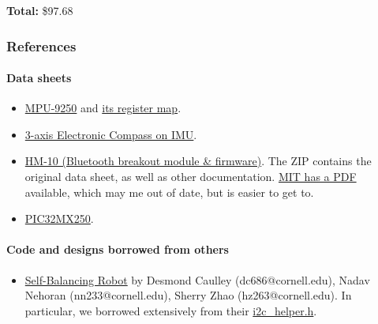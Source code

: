 \documentclass[]{article}
\providecommand{\tightlist}{%
  \setlength{\itemsep}{0pt}\setlength{\parskip}{0pt}}
\let\oldparagraph\paragraph
\renewcommand{\paragraph}[1]{\oldparagraph{#1}\mbox{}}
\begin{document}
\textbf{Total:} \$97.68

\hypertarget{references}{%
\subsubsection{References}\label{references}}

\hypertarget{data-sheets}{%
\paragraph{Data sheets}\label{data-sheets}}

\begin{itemize}
\tightlist
\item
  \href{https://www.invensense.com/wp-content/uploads/2015/02/PS-MPU-9250A-01-v1.1.pdf}{MPU-9250}
  and
  \href{https://cdn.sparkfun.com/assets/learn_tutorials/5/5/0/MPU-9250-Register-Map.pdf}{its
  register map}.
\item
  \href{https://www.akm.com/akm/en/file/datasheet/AK8963C.pdf}{3-axis
  Electronic Compass on IMU}.
\item
  \href{http://www.jnhuamao.cn/bluetooth40_en.zip}{HM-10 (Bluetooth
  breakout module \& firmware)}. The ZIP contains the original data
  sheet, as well as other documentation.
  \href{http://fab.cba.mit.edu/classes/863.15/doc/tutorials/programming/bluetooth/bluetooth40_en.pdf}{MIT
  has a PDF} available, which may me out of date, but is easier to get
  to.
\item
  \href{http://ww1.microchip.com/downloads/en/DeviceDoc/60001168J.pdf}{PIC32MX250}.
\end{itemize}

\hypertarget{code-and-designs-borrowed-from-others}{%
\paragraph{Code and designs borrowed from
others}\label{code-and-designs-borrowed-from-others}}

\begin{itemize}
\tightlist
\item
  \href{https://people.ece.cornell.edu/land/courses/ece4760/FinalProjects/f2015/dc686_nn233_hz263/final_project_webpage_v2/dc686_nn233_hz263/index.html}{Self-Balancing
  Robot} by Desmond Caulley (dc686@cornell.edu), Nadav Nehoran
  (nn233@cornell.edu), Sherry Zhao (hz263@cornell.edu). In particular,
  we borrowed extensively from their
  \href{https://people.ece.cornell.edu/land/courses/ece4760/FinalProjects/f2015/dc686_nn233_hz263/final_project_webpage_v2/dc686_nn233_hz263/dc686_nn233_hz263/i2c_helper.h}{i2c\_helper.h}.
\end{itemize}
\end{document}
